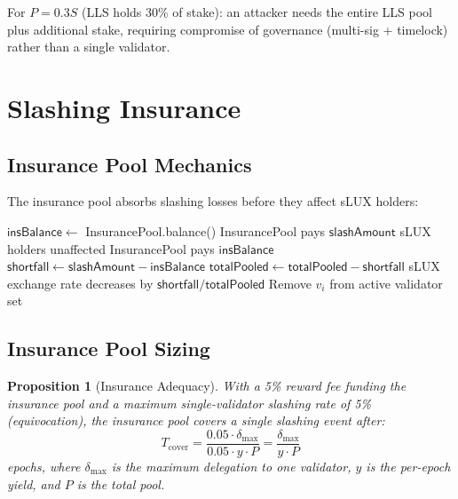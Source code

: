 \documentclass[11pt,a4paper]{article}
\newtheorem{proposition}[theorem]{Proposition}
\begin{document}
For $P = 0.3S$ (LLS holds 30\% of stake): an attacker needs the entire LLS pool plus additional stake, requiring compromise of governance (multi-sig + timelock) rather than a single validator.

\section{Slashing Insurance}\label{sec:insurance}

\subsection{Insurance Pool Mechanics}

The insurance pool absorbs slashing losses before they affect sLUX holders:

\begin{algorithm}[H]
\caption{Slashing Loss Absorption}
\label{alg:insurance}
\begin{algorithmic}[1]
    \State $\mathsf{insBalance} \gets$ InsurancePool.balance()
        \State InsurancePool pays $\mathsf{slashAmount}$ 
        \State sLUX holders unaffected
    \Else
        \State InsurancePool pays $\mathsf{insBalance}$
        \State $\mathsf{shortfall} \gets \mathsf{slashAmount} - \mathsf{insBalance}$
        \State $\mathsf{totalPooled} \gets \mathsf{totalPooled} - \mathsf{shortfall}$ 
        \State sLUX exchange rate decreases by $\mathsf{shortfall}/\mathsf{totalPooled}$
    \EndIf
    \State Remove $v_i$ from active validator set
\EndProcedure
\end{algorithmic}
\end{algorithm}

\subsection{Insurance Pool Sizing}

\begin{proposition}[Insurance Adequacy]
With a 5\% reward fee funding the insurance pool and a maximum single-validator slashing rate of 5\% (equivocation), the insurance pool covers a single slashing event after:
\begin{equation}
    T_{\text{cover}} = \frac{0.05 \cdot \delta_{\max}}{0.05 \cdot y \cdot P} = \frac{\delta_{\max}}{y \cdot P}
\end{equation}
epochs, where $\delta_{\max}$ is the maximum delegation to one validator, $y$ is the per-epoch yield, and $P$ is the total pool.
\end{proposition}
\end{document}
